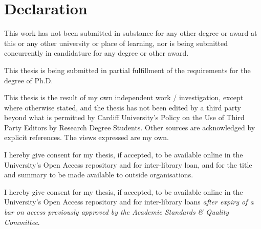 \documentclass[../thesis.tex]{subfiles}
\begin{document}
\chapter*{Declaration}
\begin{singlespace}
This work has not been submitted in substance for any other degree or award at this or any other university or place of learning, nor is being submitted concurrently in candidature for any degree or other award.\\[\baselineskip]

\signatureblock

\noindent
This thesis is being submitted in partial fulfillment of the requirements for the degree of Ph.D.\\[\baselineskip]

\signatureblock

\noindent
This thesis is the result of my own independent work / investigation, except where otherwise stated, and the thesis has not been edited by a third party beyond what is permitted by Cardiff University’s Policy on the Use of Third Party Editors by Research Degree Students. Other sources are acknowledged by explicit references.  The views expressed are my own.\\[\baselineskip]

\signatureblock

\noindent
I hereby give consent for my thesis, if accepted, to be available online in the University’s Open Access repository and for inter-library loan, and for the title and summary to be made available to outside organisations.\\[\baselineskip]

\signatureblock

\noindent
I hereby give consent for my thesis, if accepted, to be available online in the University’s Open Access repository and for inter-library loans \textit{after expiry of a bar on access previously approved by the Academic Standards \& Quality Committee}. \\[\baselineskip]

\signatureblock
\end{singlespace}
\end{document}
